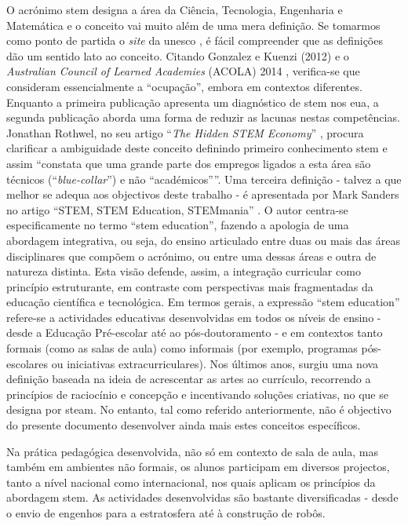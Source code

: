 O acrónimo \acrshort{stem} designa a área da Ciência, Tecnologia, Engenharia e Matemática e o conceito vai muito além de uma mera definição. Se tomarmos como ponto de partida o \textit{site} da \acrshort{unesco} \cite{GlossaryUNESCO}, é fácil compreender que as definições dão um sentido lato ao conceito. Citando Gonzalez e Kuenzi (2012) \cite{GonzalezKuenzi} e o \textit{Australian Council of Learned Academies} (ACOLA) 2014 \cite{acola}, verifica-se que consideram essencialmente a ``ocupação'', embora em contextos diferentes. Enquanto a primeira publicação apresenta um diagnóstico de \acrshort{stem} nos \acrfull{eua}, a segunda publicação aborda uma forma de reduzir as lacunas nestas competências. Jonathan Rothwel, no seu artigo ``\textit{The Hidden STEM Economy}'' \cite{TheHidde2:online}, procura clarificar a ambiguidade deste conceito definindo primeiro conhecimento \acrshort{stem} e assim ``constata que uma grande parte dos empregos ligados a esta área são técnicos (``\textit{blue-collar}'') e não ``académicos''''. Uma terceira definição - talvez a que melhor se adequa aos objectivos deste trabalho - é apresentada por Mark Sanders no artigo “STEM, STEM Education, STEMmania” \cite{TTTSTEMA77:online}. O autor centra-se especificamente no termo ``\acrshort{stem} education'', fazendo a apologia de uma abordagem integrativa, ou seja, do ensino articulado entre duas ou mais das áreas disciplinares que compõem o acrónimo, ou entre uma dessas áreas e outra de natureza distinta. Esta visão defende, assim, a integração curricular como princípio estruturante, em contraste com perspectivas mais fragmentadas da educação científica e tecnológica.
Em termos gerais, a expressão ``\acrshort{stem} education'' refere-se a actividades educativas desenvolvidas em todos os níveis de ensino - desde a Educação Pré-escolar até ao pós-doutoramento - e em contextos tanto formais (como as salas de aula) como informais (por exemplo, programas pós-escolares ou iniciativas extracurriculares). Nos últimos anos, surgiu uma nova definição baseada na ideia de acrescentar as artes ao currículo, recorrendo a princípios de raciocínio e concepção e incentivando soluções criativas, no que se designa por \acrfull{steam}. No entanto, tal como referido anteriormente, não é objectivo do presente documento desenvolver ainda mais estes conceitos específicos.

Na prática pedagógica desenvolvida, não só em contexto de sala de aula, mas também em ambientes não formais, os alunos participam em diversos projectos, tanto a nível nacional como internacional, nos quais aplicam os princípios da abordagem \acrshort{stem}. As actividades desenvolvidas são bastante diversificadas - desde o envio de engenhos para a estratosfera até à construção de robôs.

